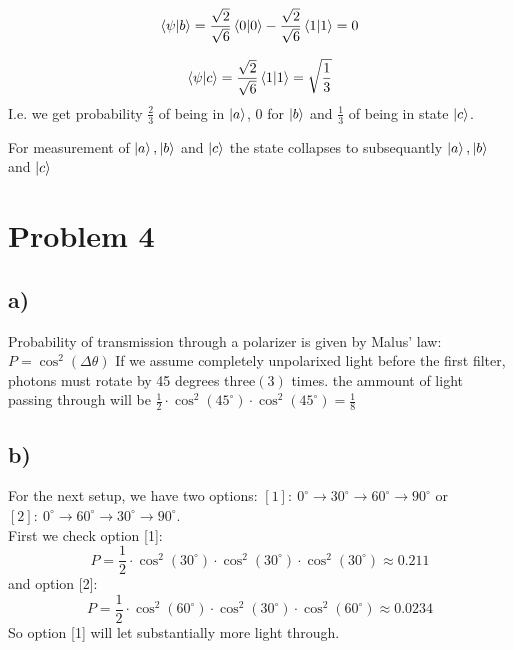 \documentclass[11pt,a4paper]{article}
\begin{document}
\begin{equation}
    \braket{\psi|b} = \frac{\sqrt{2}}{\sqrt{6}}\braket{0|0} - \frac{\sqrt{2}}{\sqrt{6}}\braket{1|1} = 0
\end{equation}

\begin{equation}
    \braket{\psi|c} = \frac{\sqrt{2}}{\sqrt{6}}\braket{1|1} = \sqrt{\frac{1}{3}}
\end{equation}
I.e. we get probability $\frac{2}{3}$ of being in $\ket{a}$, $0$ for $\ket{b}$ and $\frac{1}{3}$ of being in state $\ket{c}$.

For measurement of $\ket{a},\ket{b} $ and $ \ket{c}$ the state collapses to subsequantly $\ket{a},\ket{b} $ and $ \ket{c}$


\section*{Problem 4}
\subsection*{a)}
Probability of transmission through a polarizer is given by Malus' law: $P = \cos^2\left(\Delta\theta\right)$
If we assume completely unpolarixed light before the first filter, photons must rotate by 45 degrees three$\left(3\right)$ times.  the ammount of light passing through will be $\frac{1}{2} \cdot \cos^2\left(45^\circ\right) \cdot \cos^2\left(45^\circ\right) = \frac{1}{8}$
\subsection*{b)}
For the next setup, we have two options: $\left[1\right]:~0^\circ\rightarrow30^\circ\rightarrow60^\circ\rightarrow90^\circ$ or $\left[2\right]:~0^\circ\rightarrow60^\circ\rightarrow30^\circ\rightarrow90^\circ$.\\
First we check option [1]:
\begin{equation*}
    P = \frac{1}{2} \cdot \cos^2 \left(30^\circ\right)
                    \cdot \cos^2 \left(30^\circ\right)
                    \cdot \cos^2 \left(30^\circ\right)
      \approx  0.211
\end{equation*}
and option [2]:
\begin{equation*}
    P = \frac{1}{2} \cdot \cos^2 \left(60^\circ\right)
                    \cdot \cos^2 \left(30^\circ\right)
                    \cdot \cos^2 \left(60^\circ\right)
      \approx 0.0234
\end{equation*}
So option [1] will let substantially more light through. 
\end{document}
